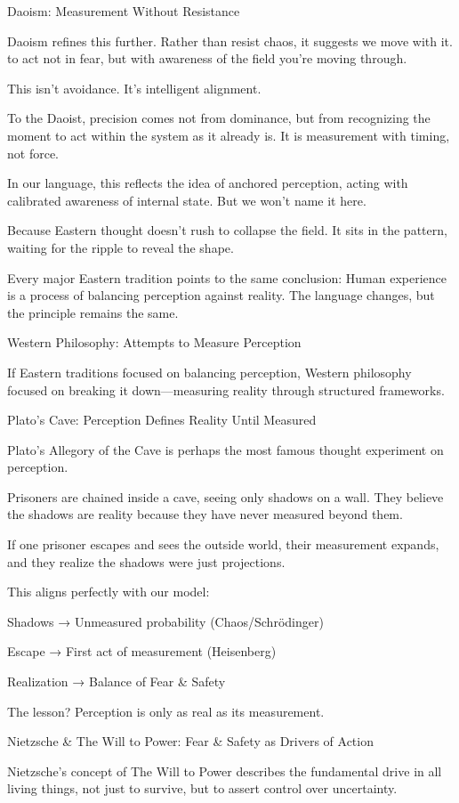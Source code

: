 \documentclass[11pt]{article}
\begin{document}
Daoism: Measurement Without Resistance

Daoism refines this further.
Rather than resist chaos, it suggests we move with it.
to act not in fear, but with awareness of the field you're moving through.

This isn’t avoidance. It’s intelligent alignment.

To the Daoist, precision comes not from dominance, but from recognizing the moment to act within the system as it already is. It is measurement with timing, not force.

In our language, this reflects the idea of anchored perception, acting with calibrated awareness of internal state. But we won’t name it here.

Because Eastern thought doesn’t rush to collapse the field.
It sits in the pattern, waiting for the ripple to reveal the shape.

Every major Eastern tradition points to the same conclusion:
Human experience is a process of balancing perception against reality.
The language changes, but the principle remains the same.

Western Philosophy: Attempts to Measure Perception

If Eastern traditions focused on balancing perception, Western philosophy focused on breaking it down—measuring reality through structured frameworks.

Plato’s Cave: Perception Defines Reality Until Measured

Plato’s Allegory of the Cave is perhaps the most famous thought experiment on perception.

Prisoners are chained inside a cave, seeing only shadows on a wall.
They believe the shadows are reality because they have never measured beyond them.

If one prisoner escapes and sees the outside world, their measurement expands, and they realize the shadows were just projections.

This aligns perfectly with our model:

Shadows → Unmeasured probability (Chaos/Schrödinger)

Escape → First act of measurement (Heisenberg)

Realization → Balance of Fear & Safety

The lesson?
Perception is only as real as its measurement.

Nietzsche & The Will to Power: Fear & Safety as Drivers of Action

Nietzsche’s concept of The Will to Power describes the fundamental drive in all living things, not just to survive, but to assert control over uncertainty.
\end{document}
